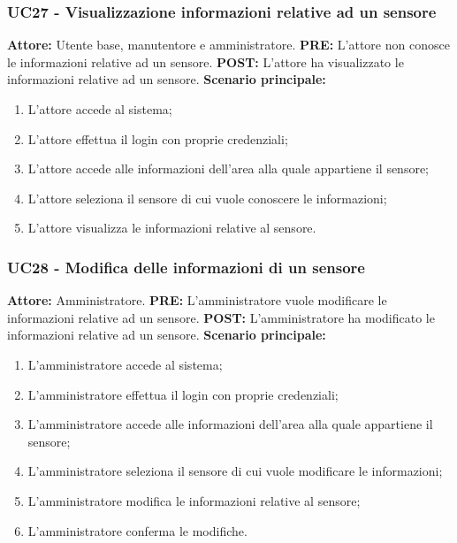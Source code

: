 \documentclass[a4paper, 12pt]{article}
\begin{document}
\subsubsection{UC27 - Visualizzazione informazioni relative ad un sensore}
\textbf{Attore: } Utente base, manutentore e amministratore.\newline
\textbf{PRE: } L'attore non conosce le informazioni relative ad un sensore.\newline
\textbf{POST: } L'attore ha visualizzato le informazioni relative ad un sensore.\newline
\textbf{Scenario principale: }
\begin{enumerate}
    \item L'attore accede al sistema;
    \item L'attore effettua il login con proprie credenziali;
    \item L'attore accede alle informazioni dell'area alla quale appartiene il sensore;
    \item L'attore seleziona il sensore di cui vuole conoscere le informazioni;
    \item L'attore visualizza le informazioni relative al sensore.
\end{enumerate}

\subsubsection{UC28 - Modifica delle informazioni di un sensore}
\textbf{Attore: } Amministratore.\newline
\textbf{PRE: } L'amministratore vuole modificare le informazioni relative ad un sensore.\newline
\textbf{POST: } L'amministratore ha modificato le informazioni relative ad un sensore.\newline
\textbf{Scenario principale: }
\begin{enumerate}
    \item L'amministratore accede al sistema;
    \item L'amministratore effettua il login con proprie credenziali;
    \item L'amministratore accede alle informazioni dell'area alla quale appartiene il sensore;
    \item L'amministratore seleziona il sensore di cui vuole modificare le informazioni;
    \item L'amministratore modifica le informazioni relative al sensore;
    \item L'amministratore conferma le modifiche.
\end{enumerate}
\end{document}
